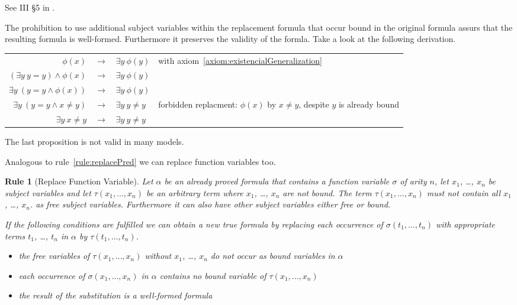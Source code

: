 \documentclass[a4paper,german,10pt,twoside]{book}
\newtheorem{rul}{Rule}
\theoremstyle{definition}
\theoremstyle{remark}
\begin{document}
See III \S 5 in \cite{hilback}.

\par
The prohibition to use additional subject variables within the replacement formula that occur bound in the original formula assurs that the resulting formula is well-formed. Furthermore it preserves the validity of the formla. Take a look at the following derivation.

\par
\begin{tabularx}{\linewidth}{rclX}
  $ \phi(x)$                             & $\rightarrow$ & $\exists y \ \phi(y)$  
    & with axiom~\ref{axiom:existencialGeneralization} \\
  $ (\exists y \ y = y) \land \phi(x)$   & $\rightarrow$ & $\exists y \ \phi(y)$  
    &  \\
  $ \exists y \ (y = y \land \phi(x))$   & $\rightarrow$ & $\exists y \ \phi(y)$  
    &  \\
  $ \exists y \ (y = y \land x \neq y)$  & $\rightarrow$ & $\exists y \ y \neq y$  
    & forbidden replacment: $\phi(x)$ by $x \neq y$, despite $y$ is already bound \\
  $ \exists y \  x \neq y$  & $\rightarrow$ & $\exists y \ y \neq y$  
    &
\end{tabularx}

\par
The last proposition is not valid in many models.


\par
Analogous to rule~\ref{rule:replacePred} we can replace function variables too.

\begin{rul}[Replace Function Variable]
\label{rule:replaceFunct} \hypertarget{rule:replaceFunct}{}
Let $\alpha$ be an already proved formula that contains a function variable $\sigma$ of arity $n$, let $x_1$, \ldots, $x_n$ be subject variables and let $\tau(x_1, \ldots, x_n)$ be an arbitrary term where $x_1$, \ldots, $x_n$ are not bound. 
The term $\tau(x_1, \ldots, x_n)$ must not contain all $x_1$, \ldots, $x_n$. as free subject variables. Furthermore it can also have other subject variables either free or bound. 

If the following conditions are fulfilled we can obtain a new true formula by replacing each occurrence of $\sigma(t_1, \ldots, t_n)$ with appropriate terms $t_1$, \ldots, $t_n$ in $\alpha$ by $\tau(t_1, \ldots, t_n)$.

\begin{itemize}

\item 
the free variables of $\tau(x_1, \ldots, x_n)$ without $x_1$, \ldots, $x_n$ do not occur as bound variables in $\alpha$

\item
each occurrence of $\sigma(x_1, \ldots, x_n)$ in $\alpha$ contains no bound variable of $\tau(x_1, \ldots, x_n)$

\item
the result of the substitution is a well-formed formula
                  
\end{itemize}
\end{rul}
\end{document}
